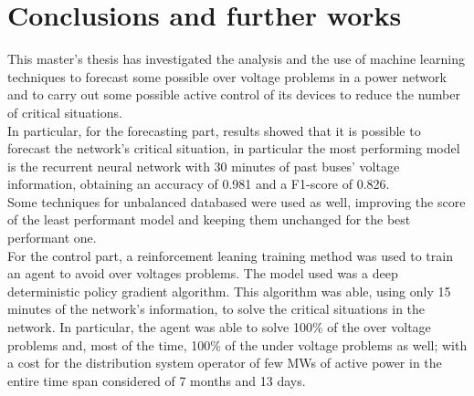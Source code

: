 \section{Conclusions and further works}
This master's thesis has investigated the analysis and the use of machine learning techniques to forecast some possible over voltage problems in a power network and to carry out some possible active control of its devices to reduce the number of critical situations.\\

In particular, for the forecasting part, results showed that it is possible to forecast the network's critical situation, in particular the most performing model is the recurrent neural network with 30 minutes of past buses' voltage information, obtaining an accuracy of 0.981 and a F1-score of 0.826.\\
Some techniques for unbalanced databased were used as well, improving the score of the least performant model and keeping them unchanged for the best performant one.\\

For the control part, a reinforcement leaning training method was used to train an agent to avoid over voltages problems. The model used was a deep deterministic policy gradient algorithm. This algorithm was able, using only  15 minutes of the network's information, to solve the critical situations in the network. In particular, the agent was able to solve 100\% of the over voltage problems and, most of the time, 100\% of the under voltage problems as well; with a cost for the distribution system operator of few MWs of active power in the entire time span considered of 7 months and 13 days.